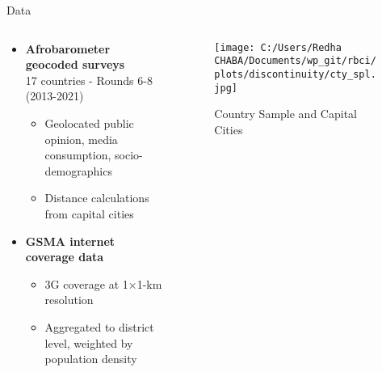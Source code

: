 \documentclass[aspectratio=169,xcolor=dvipsnames]{beamer}
\begin{document}
\begin{frame}{Data}
\begin{columns}
\begin{column}{0.5\textwidth}
\begin{itemize}
    \item \textbf{Afrobarometer geocoded surveys}\\
    17 countries - Rounds 6-8 (2013-2021)
    \vspace{0.5em}
    \begin{itemize}
        \item Geolocated public opinion, media consumption, socio-demographics
        \vspace{0.5em}
        \item Distance calculations from capital cities
        \vspace{0.5em}
    \end{itemize}
    \vspace{0.5em}
    \item \textbf{GSMA internet coverage data}
    \vspace{0.5em}
    \begin{itemize}
        \item 3G coverage at 1×1-km resolution
     \vspace{0.5em}
        \item Aggregated to district level, weighted by population density
      \vspace{0.5em}
    \end{itemize}
    
\end{itemize}

\end{column}
\begin{column}{0.5\textwidth}
\begin{figure}
    \centering
    \texttt{[image: C:/Users/Redha CHABA/Documents/wp\_git/rbci/plots/discontinuity/cty\_spl.jpg]}
    \caption{Country Sample and Capital Cities}
\end{figure}
\end{column}
\end{columns}
\end{frame}
\end{document}
